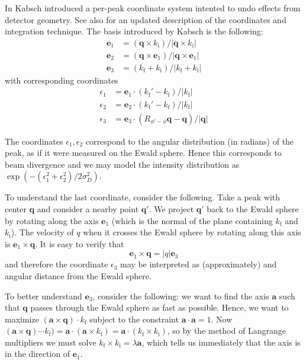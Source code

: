 \documentclass[11pt,a4paper]{article}
\def\v#1{\bm{{#1}}}
\def\si{\text{i}}
\def\sf{\text{f}}
\def\ba{\v{a}}
\def\be{{\v{e}}}
\def\q{{\v{q}}}
\begin{document}
In \cite{Kab88} Kabsch introduced a per-peak coordinate system intented to undo effects from detector geometry.
See also \cite{Kab10b} for an updated description of the coordinates and integration technique.
The basis introduced by Kabsch is the following:
\begin{align}
  \be_1 &= (\q \times k_\si) / |\q \times k_\si| \\
  \be_2 &= (\q \times \be_1) / |\q \times \be_1| \\
  \be_3 &= (k_\sf + k_\si) / |k_\sf + k_\si|
\end{align}
with corresponding coordinates
\begin{align}
  \epsilon_1 &= \be_1 \cdot (k_\sf'-k_\sf) / |k_\sf| \\
  \epsilon_2 &= \be_2 \cdot (k_\sf'-k_\sf) / |k_\sf| \\
  \epsilon_3 &= \be_3 \cdot (R_{\phi'-\phi}\q-\q) / |\q|
\end{align}

The coordinates $\epsilon_1, \epsilon_2$ correspond to the angular distribution (in radians) of the peak, as if it were measured on the Ewald sphere. Hence this corresponds to beam divergence and we may model the intensity distribution as $\exp(-(\epsilon_1^2 + \epsilon_2^2)/2 \sigma_D^2)$.

To understand the last coordinate, consider the following. Take a peak with center $\q$ and consider a nearby point $\q'$. We project $\q'$ back to the Ewald sphere by rotating along the axis $\be_1$ (which is the normal of the plane containing $k_\sf$ and $k_\si$). The velocity of $q$ when it crosses the Ewald sphere by rotating along this axis is $\be_1 \times \q$. It is easy to verify that
\begin{equation} \be_1 \times \q = |q| \be_3 \end{equation}
and therefore the coordinate $\epsilon_3$ may be interpreted as (approximately) and angular distance from the Ewald sphere.

To better understand $\be_3$, consider the following: we want to find the axis $\ba$ such that $\q$ passes through the Ewald sphere as fast as possible. Hence, we want to maximize $(\ba \times \q) \cdot k_\sf$ subject to the constraint $\ba \cdot \ba = 1$.
Now $(\ba \times \q) \cdots k_\sf) = \ba \cdot (\ba \times k_\sf) = \ba \cdot (k_\sf \times k_\si)$, so by the method of Langrange multipliers we must solve $k_\sf \times k_\si = \lambda \ba$, which tells us immediately that the axis is in the direction of $\be_1$.
\end{document}
